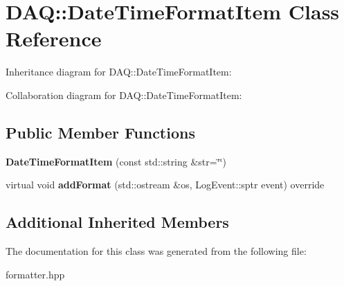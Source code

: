 \hypertarget{classDAQ_1_1DateTimeFormatItem}{}\section{D\+AQ\+:\+:Date\+Time\+Format\+Item Class Reference}
\label{classDAQ_1_1DateTimeFormatItem}


Inheritance diagram for D\+AQ\+:\+:Date\+Time\+Format\+Item\+:


Collaboration diagram for D\+AQ\+:\+:Date\+Time\+Format\+Item\+:
\subsection*{Public Member Functions}
\begin{DoxyCompactItemize}
\item 
\mbox{\label{classDAQ_1_1DateTimeFormatItem_a3055eb38258892cd6317c0a546127bbc}} 
{\bfseries Date\+Time\+Format\+Item} (const std\+::string \&str=\char`\"{}\char`\"{})
\item 
\mbox{\label{classDAQ_1_1DateTimeFormatItem_a93c19723e8c357b86be1c4f836cf2d24}} 
virtual void {\bfseries add\+Format} (std\+::ostream \&os, Log\+Event\+::sptr event) override
\end{DoxyCompactItemize}
\subsection*{Additional Inherited Members}


The documentation for this class was generated from the following file\+:\begin{DoxyCompactItemize}
\item 
formatter.\+hpp\end{DoxyCompactItemize}
